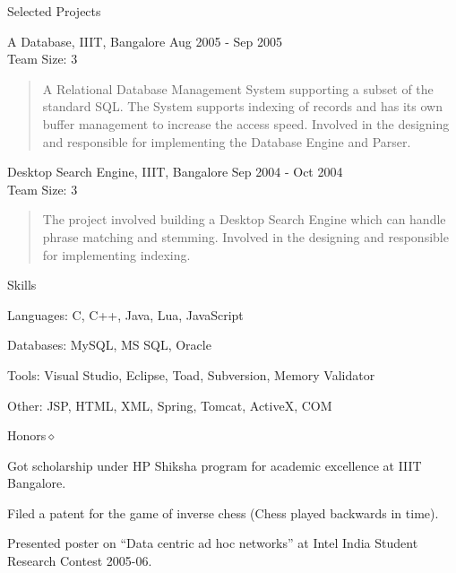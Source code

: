 \documentclass{resume}
\newcommand{\teamsize}{\\\sc\footnotesize Team Size: }
\begin{document}
\begin{category}{Selected Projects}{}
    \item {\topic A Database,} IIIT, Bangalore %
        {\period Aug 2005 - Sep 2005}
	{\teamsize 3}
        \begin{quote}
            A Relational Database Management System supporting a subset of the
            standard SQL. The System supports indexing of records and has its
            own buffer management to increase the access speed.  Involved in
            the designing and responsible for implementing the Database Engine
            and Parser.
        \end{quote}

    \item {\topic Desktop Search Engine,} IIIT, Bangalore
        {\period Sep 2004 - Oct 2004}
	{\teamsize 3}
        \begin{quote}
            The project involved building a Desktop Search Engine which can
            handle phrase matching and stemming.  Involved in the designing and
            responsible for implementing indexing.
        \end{quote}

\end{category}


\begin{category}{Skills}{}

    \item {\topic Languages:} C, C++, Java, Lua, JavaScript
    \item {\topic Databases:} MySQL, MS SQL, Oracle
    \item {\topic Tools:} Visual Studio,  Eclipse, Toad, Subversion, Memory
        Validator
    \item {\topic Other:} JSP, HTML, XML, Spring, Tomcat,  ActiveX, COM

\end{category}


\begin{category}{Honors}{$\diamond$}

    \item Got scholarship under HP Shiksha program for academic excellence at
        IIIT Bangalore.

    \item Filed a patent for the game of inverse chess (Chess played backwards
        in time).

    \item Presented poster on ``Data centric ad hoc networks'' at Intel India
        Student Research Contest 2005-06.

\end{category}
\end{document}
